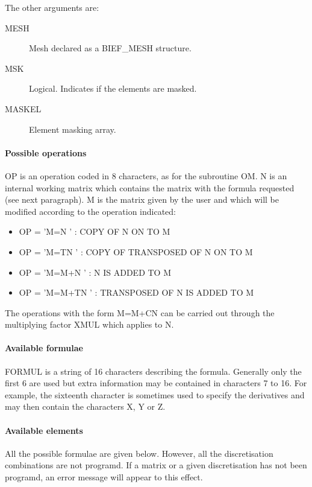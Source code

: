 The other arguments are:
\begin{description}
  \item [MESH] Mesh declared as a BIEF\_MESH structure.
  \item [MSK] Logical. Indicates if the elements are masked.
  \item [MASKEL] Element masking array.
\end{description}

\paragraph{Possible operations}

OP is an operation coded in 8 characters, as for the subroutine OM. N is an
internal working matrix which contains the matrix with the formula requested
(see next paragraph). M is the matrix given by the user and which will be
modified according to the operation indicated:

\begin{itemize}
  \item OP = 'M=N     ' : COPY OF N ON TO M
  \item OP = 'M=TN    ' : COPY OF TRANSPOSED OF N ON TO M
  \item OP = 'M=M+N   ' : N IS ADDED TO M
  \item OP = 'M=M+TN  ' : TRANSPOSED OF N IS ADDED TO M
\end{itemize}

The operations with the form M=M+CN can be carried out through the multiplying
factor XMUL which applies to N.

\paragraph{Available formulae}

FORMUL is a string of 16 characters describing the formula. Generally only the
first 6 are used but extra information may be contained in characters 7 to 16.
For example, the sixteenth character is sometimes used to specify the
derivatives and may then contain the characters X, Y or Z.

\paragraph{Available elements}

All the possible formulae are given below. However, all the discretisation
combinations are not programd. If a matrix or a given discretisation has not
been programd, an error message will appear to this effect.

